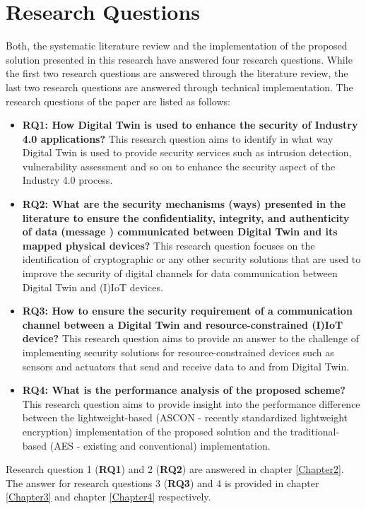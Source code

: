 \section{Research Questions}
Both, the systematic literature review and the implementation of the proposed solution presented in this research have answered four research questions. While the first two research questions are answered through the literature review, the last two research questions are answered through technical implementation. The research questions of the paper are listed as follows: 
\begin{itemize}
    \item \textbf{RQ1: How Digital Twin is used to enhance the security of Industry 4.0 applications?} \label{lbl:rq1} This research question aims to identify in what way Digital Twin is used to provide security services such as intrusion detection, vulnerability assessment and so on to enhance the security aspect of the Industry 4.0 process.
    \item \textbf{RQ2: What are the security mechanisms (ways) presented in the literature to ensure the confidentiality, integrity, and authenticity of data (message ) communicated between Digital Twin and its mapped physical devices?} This research question focuses on the identification of cryptographic or any other security solutions that are used to improve the security of digital channels for data communication between Digital Twin and (I)IoT devices. 
    \item \textbf{RQ3: How to ensure the security requirement of a communication channel between a Digital Twin and resource-constrained (I)IoT device?} This research question aims to provide an answer to the challenge of implementing security solutions for resource-constrained devices such as sensors and actuators that send and receive data to and from Digital Twin. 
    \item \textbf{RQ4: What is the performance analysis of the proposed scheme?} This research question aims to provide insight into the performance difference between the lightweight-based (ASCON - recently standardized lightweight encryption) implementation of the proposed solution and the traditional-based (AES - existing and conventional) implementation. 
\end{itemize}

Research question 1 (\textbf{RQ1}) and 2 (\textbf{RQ2}) are answered in chapter \ref{Chapter2}. The answer for research questions 3 (\textbf{RQ3}) and 4 is provided in chapter \ref{Chapter3} and chapter \ref{Chapter4} respectively. 

